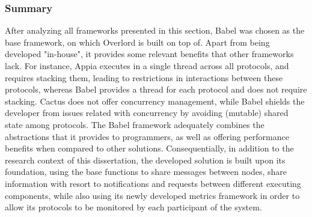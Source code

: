 \subsubsection{Summary} After analyzing all frameworks presented in this section, Babel was chosen as the base framework, on which Overlord is built on top of. Apart from being developed "in-house", it provides some relevant benefits that other frameworks lack. For instance, Appia executes in a single thread across all protocols, and requires stacking them, leading to restrictions in interactions between these protocols, whereas Babel provides a thread for each protocol and does not require stacking. Cactus does not offer concurrency management, while Babel shields the developer from issues related with concurrency by avoiding (mutable) shared state among protocols. The Babel framework adequately combines the abstractions that it provides to programmers, as well as offering performance benefits when compared to other solutions. Consequentially, in addition to the research context of this dissertation, the developed solution is built upon its foundation, using the base functions to share messages between nodes, share information with resort to notifications and requests between different executing components, while also using its newly developed metrics framework\cite{Paulico2025} in order to allow its protocols to be monitored by each participant of the system.